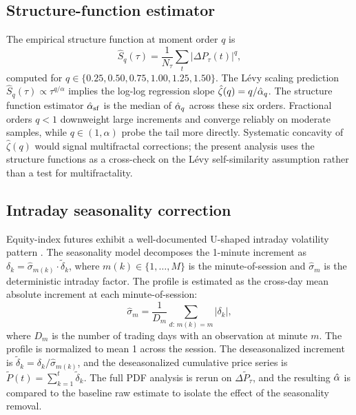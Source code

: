 \documentclass[12pt,a4paper]{article}
\begin{document}
\subsection{Structure-function estimator}
\label{sec:methodology:sf}

The empirical structure function at moment order $q$ is
\begin{equation}
  \hat{S}_q(\tau)
  = \frac{1}{N_\tau}\sum_t |\Delta P_\tau(t)|^q,
  \label{eq:sf}
\end{equation}
computed for $q\in\{0.25,0.50,0.75,1.00,1.25,1.50\}$.
The Lévy scaling prediction $\hat{S}_q(\tau) \propto \tau^{q/\alpha}$ implies
the log-log regression slope $\hat\zeta(q) = q/\hat{\alpha}_q$. The
structure function estimator $\hat{\alpha}_{\mathrm{sf}}$ is the median of
$\hat{\alpha}_q$ across these six orders. Fractional orders $q<1$ downweight
large increments and converge reliably on moderate samples, while
$q\in(1,\alpha)$ probe the tail more directly. Systematic concavity of
$\hat\zeta(q)$ would signal multifractal corrections; the present analysis
uses the structure functions as a cross-check on the Lévy self-similarity
assumption rather than a test for multifractality.

\subsection{Intraday seasonality correction}
\label{sec:methodology:seasonality}

Equity-index futures exhibit a well-documented U-shaped intraday volatility
pattern \cite{WoodMcInishOrd1985,AndersenBollerslev1997}. The
seasonality model decomposes the 1-minute increment as $\delta_k =
\hat\sigma_{m(k)}\cdot\tilde\delta_k$, where $m(k)\in\{1,\ldots,M\}$ is the
minute-of-session and $\hat\sigma_m$ is the deterministic intraday factor. The
profile is estimated as the cross-day mean absolute increment at each
minute-of-session:
\begin{equation}
  \hat\sigma_m
  = \frac{1}{D_m}\sum_{d:\,m(k)=m}|\delta_k|,
  \label{eq:profile}
\end{equation}
where $D_m$ is the number of trading days with an observation at minute $m$.
The profile is normalized to mean 1 across the session. The deseasonalized
increment is $\tilde\delta_k = \delta_k/\hat\sigma_{m(k)}$, and the
deseasonalized cumulative price series is $\tilde{P}(t)
= \sum_{k=1}^t\tilde\delta_k$. The full PDF analysis is rerun on
$\Delta\tilde{P}_\tau$, and the resulting $\hat{\alpha}$ is compared to the
baseline raw estimate to isolate the effect of the seasonality removal.
\end{document}
